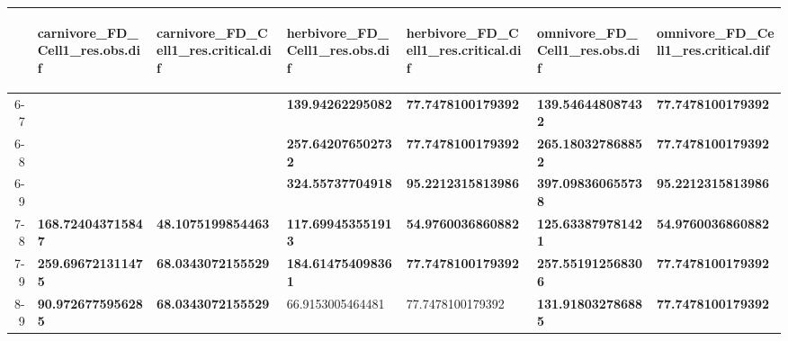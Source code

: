 \begin{table}[ht]
\centering
\begin{tabular}{rllllll}
  \toprule
 & \begin{sideways} carnivore_FD_Cell1_res.obs.dif \end{sideways} & \begin{sideways} carnivore_FD_Cell1_res.critical.dif \end{sideways} & \begin{sideways} herbivore_FD_Cell1_res.obs.dif \end{sideways} & \begin{sideways} herbivore_FD_Cell1_res.critical.dif \end{sideways} & \begin{sideways} omnivore_FD_Cell1_res.obs.dif \end{sideways} & \begin{sideways} omnivore_FD_Cell1_res.critical.dif \end{sideways} \\ 
  \midrule
6-7 &  &  & \textbf{139.94262295082} & \textbf{77.7478100179392} & \textbf{139.546448087432} & \textbf{77.7478100179392} \\ 
  6-8 &  &  & \textbf{257.642076502732} & \textbf{77.7478100179392} & \textbf{265.180327868852} & \textbf{77.7478100179392} \\ 
  6-9 &  &  & \textbf{324.55737704918} & \textbf{95.2212315813986} & \textbf{397.098360655738} & \textbf{95.2212315813986} \\ 
  7-8 & \textbf{168.724043715847} & \textbf{48.1075199854463} & \textbf{117.699453551913} & \textbf{54.9760036860882} & \textbf{125.633879781421} & \textbf{54.9760036860882} \\ 
  7-9 & \textbf{259.696721311475} & \textbf{68.0343072155529} & \textbf{184.614754098361} & \textbf{77.7478100179392} & \textbf{257.551912568306} & \textbf{77.7478100179392} \\ 
  8-9 & \textbf{90.9726775956285} & \textbf{68.0343072155529} & 66.9153005464481 & 77.7478100179392 & \textbf{131.918032786885} & \textbf{77.7478100179392} \\ 
   \bottomrule
\end{tabular}
\end{table}
